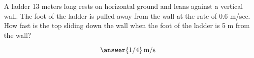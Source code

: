 \documentclass{ximera}
\author{Bart Snapp}
\begin{document}
\begin{exercise}

 A ladder 13 meters long rests on horizontal ground and leans against
 a vertical wall.  The foot of the ladder is pulled away from the wall
 at the rate of 0.6 m/sec.  How fast is the top sliding down the wall
 when the foot of the ladder is 5 m from the wall?
\begin{prompt}
  \[
  \answer{1/4}\,\text{m/s}
  \]
\end{prompt}
\end{exercise}
\end{document}

